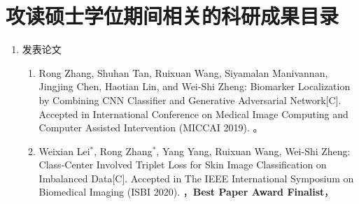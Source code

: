 \chapter{攻读硕士学位期间相关的科研成果目录}

\begin{enumerate}
	\item 发表论文
	\begin{enumerate}
		\item Rong Zhang, Shuhan Tan, Ruixuan Wang, Siyamalan Manivannan, Jingjing Chen, Haotian Lin, and Wei-Shi Zheng: Biomarker Localization by Combining CNN Classifier and Generative Adversarial Network[C]. Accepted in International Conference on Medical Image Computing and Computer Assisted Intervention (MICCAI 2019). 。
		\item Weixian Lei$^*$, Rong Zhang$^*$, Yang Yang, Ruixuan Wang, Wei-Shi Zheng: Class-Center Involved Triplet Loss  for Skin Image Classification on Imbalanced Data[C]. Accepted in The IEEE International Symposium on Biomedical Imaging (ISBI 2020). ，\textbf{Best Paper Award Finalist}， \\ 
	\end{enumerate}
	
\end{enumerate}